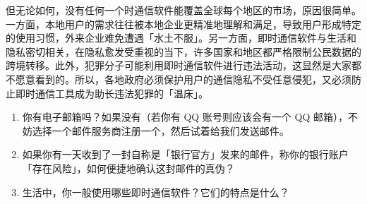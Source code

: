 但无论如何，没有任何一个时通信软件能覆盖全球每个地区的市场，原因很简单。一方面，本地用户的需求往往被本地企业更精准地理解和满足，导致用户形成特定的使用习惯，外来企业难免遭遇「水土不服」。另一方面，即时通信软件与生活和隐私密切相关，在隐私愈发受重视的当下，许多国家和地区都严格限制公民数据的跨境转移。此外，犯罪分子可能利用即时通信软件进行违法活动，这显然是大家都不愿意看到的。所以，各地政府必须保护用户的通信隐私不受任意侵犯，又必须防止即时通信工具成为助长违法犯罪的「温床」。

\practice

\begin{enumerate}
  \item 你有电子邮箱吗？如果没有（若你有 QQ 账号则应该会有一个 QQ 邮箱），不妨选择一个邮件服务商注册一个，然后试着给我们发送邮件。
  \item 如果你有一天收到了一封自称是「银行官方」发来的邮件，称你的银行账户「存在风险」，如何便捷地确认这封邮件的真伪？
  \item 生活中，你一般使用哪些即时通信软件？它们的特点是什么？
\end{enumerate}